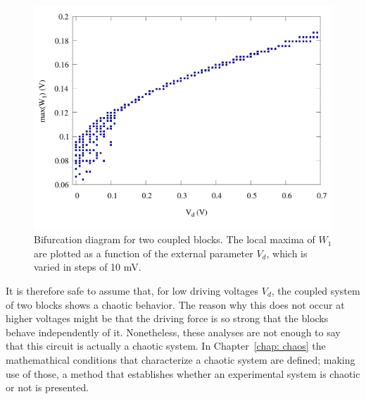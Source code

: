 \begin{figure}[!htbp]
    \centering
    \includegraphics[width=0.6\linewidth]{../blocks/2_blocks/bifurcation/bifurcation.pdf}
    \caption{Bifurcation diagram for two coupled blocks.
    The local maxima of $W_1$ are plotted as a function of the external parameter $V_d$,
    which is varied in steps of 10 mV.}\label{fig: bifurcation}
\end{figure}

It is therefore safe to assume that, for low driving voltages $V_d$, the coupled system of two blocks shows a chaotic behavior.
The reason why this does not occur at higher voltages might be that the driving force is so strong that the blocks
behave independently of it. Nonetheless, these analyses are not enough to say that this circuit is actually a chaotic system.
In Chapter~\ref{chap: chaos} the mathemathical conditions that characterize
a chaotic system are defined; making use of those, a method that establishes whether an experimental
system is chaotic or not is presented.




